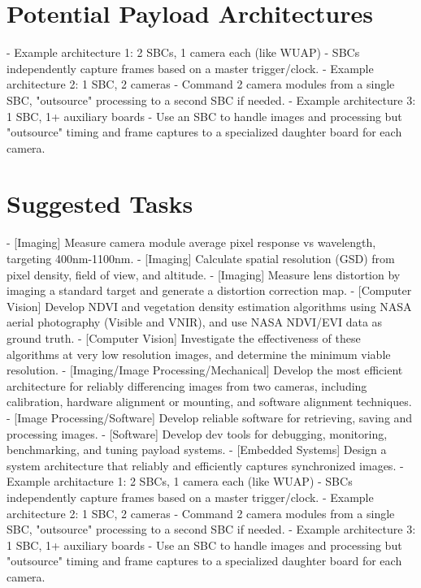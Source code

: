 \documentclass[conference]{IEEEtran} %
\begin{document}
\section{Potential Payload Architectures}
    - Example architecture 1: 2 SBCs, 1 camera each (like WUAP) - SBCs independently capture frames based on a master trigger/clock.
    - Example architecture 2: 1 SBC, 2 cameras - Command 2 camera modules from a single SBC, "outsource" processing to a second SBC if needed.
    - Example architecture 3: 1 SBC, 1+ auxiliary boards - Use an SBC to handle images and processing but "outsource" timing and frame captures to a specialized daughter board for each camera.

\section{Suggested Tasks}

- [Imaging] Measure camera module average pixel response vs wavelength, targeting 400nm-1100nm.
- [Imaging] Calculate spatial resolution (GSD) from pixel density, field of view, and altitude.
- [Imaging] Measure lens distortion by imaging a standard target and generate a distortion correction map.
- [Computer Vision] Develop NDVI and vegetation density estimation algorithms using NASA aerial photography (Visible and VNIR), and use NASA NDVI/EVI data as ground truth.
- [Computer Vision] Investigate the effectiveness of these algorithms at very low resolution images, and determine the minimum viable resolution.
- [Imaging/Image Processing/Mechanical] Develop the most efficient architecture for reliably differencing images from two cameras, including calibration, hardware alignment or mounting, and software alignment techniques.
- [Image Processing/Software] Develop reliable software for retrieving, saving and processing images.
- [Software] Develop dev tools for debugging, monitoring, benchmarking, and tuning payload systems.
- [Embedded Systems] Design a system architecture that reliably and efficiently captures synchronized images.
    - Example architacture 1: 2 SBCs, 1 camera each (like WUAP) - SBCs independently capture frames based on a master trigger/clock.
    - Example architecture 2: 1 SBC, 2 cameras - Command 2 camera modules from a single SBC, "outsource" processing to a second SBC if needed.
    - Example architecture 3: 1 SBC, 1+ auxiliary boards - Use an SBC to handle images and processing but "outsource" timing and frame captures to a specialized daughter board for each camera.
\end{document}
